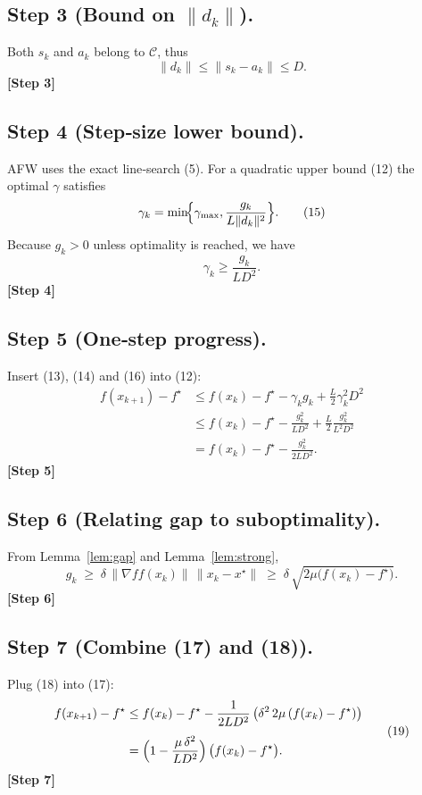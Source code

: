 \documentclass[11pt]{article}
\newcommand{\C}{\mathcal{C}}
\newcommand{\width}{\delta}
\newcommand{\grad}{\nabla f}
\begin{document}
\subsection*{Step 3 (Bound on $\|d_{k}\|$).}
Both $s_{k}$ and $a_{k}$ belong to $\C$, thus
\[
\|d_{k}\|\le\|s_{k}-a_{k}\|\le D.
\tag{14}
\]
\textbf{[Step 3]}

\subsection*{Step 4 (Step‑size lower bound).}
AFW uses the exact line‑search (5). For a quadratic upper bound (12) the optimal $\gamma$ satisfies
\[
\gamma_{k}= \min\!\Bigl\{\gamma_{\max},
\frac{g_{k}}{L\|d_{k}\|^{2}}\Bigr\}.
\tag{15}
\]
Because $g_{k}>0$ unless optimality is reached, we have
\[
\gamma_{k}\ge \frac{g_{k}}{L D^{2}}.
\tag{16}
\]
\textbf{[Step 4]}

\subsection*{Step 5 (One‑step progress).}
Insert (13), (14) and (16) into (12):
\[
\begin{aligned}
f(x_{k+1})-f^{\star}
&\le f(x_{k})-f^{\star}
- \gamma_{k} g_{k}
+\frac{L}{2}\gamma_{k}^{2}D^{2}\\[4pt]
&\le f(x_{k})-f^{\star}
- \frac{g_{k}^{2}}{L D^{2}}
+\frac{L}{2}\frac{g_{k}^{2}}{L^{2} D^{2}}\\[4pt]
&= f(x_{k})-f^{\star}
-\frac{g_{k}^{2}}{2 L D^{2}}.
\end{aligned}
\tag{17}
\]
\textbf{[Step 5]}

\subsection*{Step 6 (Relating gap to suboptimality).}
From Lemma~\ref{lem:gap} and Lemma~\ref{lem:strong},
\[
g_{k}\;\ge\;\width\,\|\grad f(x_{k})\|\,\|x_{k}-x^{\star}\|
\;\ge\;\width\,\sqrt{2\mu\bigl(f(x_{k})-f^{\star}\bigr)}.
\tag{18}
\]
\textbf{[Step 6]}

\subsection*{Step 7 (Combine (17) and (18)).}
Plug (18) into (17):
\[
\begin{aligned}
f(x_{k+1})-f^{\star}
&\le f(x_{k})-f^{\star}
-\frac{1}{2 L D^{2}}\,
\bigl(\width^{2}\,2\mu\,(f(x_{k})-f^{\star})\bigr)\\[4pt]
&= \Bigl(1-\frac{\mu\,\width^{2}}{L D^{2}}\Bigr)\,
\bigl(f(x_{k})-f^{\star}\bigr).
\end{aligned}
\tag{19}
\]
\textbf{[Step 7]}
\end{document}
